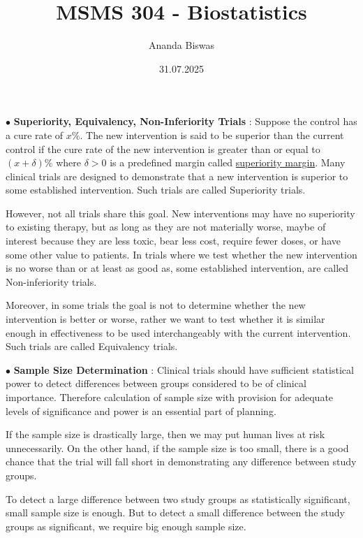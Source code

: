 \documentclass[11pt, a4paper]{article}
\title{MSMS 304 - Biostatistics}
\author{Ananda Biswas}
\date{31.07.2025}
\begin{document}
\maketitle

$\bullet$ \textbf{Superiority, Equivalency, Non-Inferiority Trials} : Suppose the control has a cure rate of $x\%$. The new intervention is said to be superior than the current control if the cure rate of the new intervention is greater than or equal to $(x + \delta) \%$ where $\delta > 0$ is a predefined margin called \underline{superiority margin}. Many clinical trials are designed to demonstrate that a new intervention is superior to some established intervention. Such trials are called Superiority trials.

However, not all trials share this goal. New interventions may have no superiority to existing therapy, but as long as they are not materially worse, maybe of interest because they are less toxic, bear less cost, require fewer doses, or have some other value to patients. In trials where we test whether the new intervention is no worse than or at least as good as, some established intervention, are called Non-inferiority trials.

Moreover, in some trials the goal is not to determine whether the new intervention is better or worse, rather we want to test whether it is similar enough in effectiveness to be used interchangeably with the current intervention. Such trials are called Equivalency trials.

\vspace{0.5cm}


$\bullet$ \textbf{Sample Size Determination} : Clinical trials should have sufficient statistical power to detect differences between groups considered to be of clinical importance. Therefore calculation of sample size with provision for adequate levels of significance and power is an essential part of planning.

If the sample size is drastically large, then we may put human lives at risk unnecessarily. On the other hand, if the sample size is too small,  there is a good chance that the trial will fall short in demonstrating any difference between study groups.

To detect a large difference between two study groups as statistically significant, small sample size is enough. But to detect a small difference between the study groups as significant, we require big enough sample size.

\vspace{0.3cm}
\end{document}
